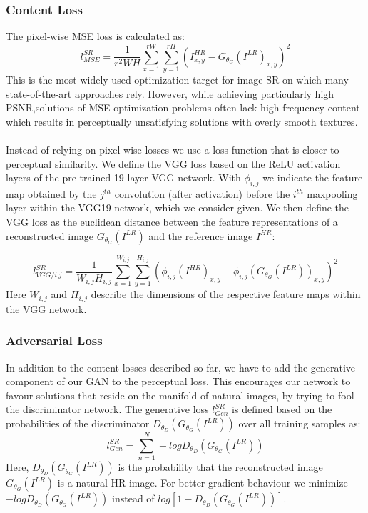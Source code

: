 \subsubsection{Content Loss}
The pixel-wise MSE loss is calculated as:
\begin{equation}
l_{MSE}^{SR}=\frac{1}{r^2WH}\sum_{x=1}^{rW}\sum_{y=1}^{rH}(I_{x,y}^{HR}-G_{\theta_{G}}(I^{LR})_{x,y})^2
\end{equation}
This is the most widely used optimization target for image
SR on which many state-of-the-art approaches rely. However, while achieving particularly high PSNR,solutions of MSE optimization problems often lack high-frequency content which results in perceptually unsatisfying solutions with overly smooth textures.\\ \\
Instead of relying on pixel-wise losses we use a loss function that is closer to perceptual similarity. We define the VGG loss based on the ReLU activation layers of the pre-trained 19 layer VGG network. With $\phi_{i,j}$ we indicate the feature map obtained by the $j^{th}$ convolution (after activation) before the $i^{th}$ maxpooling layer within the VGG19 network, which we consider given. We then define the VGG loss as the euclidean distance between the feature representations of a reconstructed image $G_{\theta_{G}}(I^{LR})$ and the reference image $I^{HR}$:

\begin{equation}
l_{VGG/i.j}^{SR}=\frac{1}{W_{i,j}H_{i,j}}\sum_{x=1}^{W_{i,j}}\sum_{y=1}^{H_{i,j}}(\phi_{i,j}(I^{HR})_{x,y}-\phi_{i,j}(G_{\theta_{G}}(I^{LR}))_{x,y})^2
\end{equation}
Here $W_{i,j}$ and $H_{i,j}$ describe the dimensions of the respective feature maps within the VGG network.

\subsubsection{Adversarial Loss}
In addition to the content losses described so far, we have to add the generative component of our GAN to the perceptual loss. This encourages our network to favour solutions that reside on the manifold of natural images, by trying to fool the discriminator network. The generative loss $l_{Gen}^{SR}$ is defined based on the probabilities of the discriminator $D_{\theta_{D}}(G_{\theta_{G}}(I^{LR}))$ over all training samples as:
\begin{equation}
l_{Gen}^{SR}=\sum_{n=1}^{N}-logD_{\theta_{D}}(G_{\theta_{G}}(I^{LR}))
\end{equation}
Here, $D_{\theta_{D}}(G_{\theta_{G}}(I^{LR}))$ is the probability that the reconstructed image $G_{\theta_{G}}(I^{LR})$ is a natural HR image. For better gradient behaviour we minimize $-logD_{\theta_{D}}(G_{\theta_{G}}(I^{LR}))$ instead of $log[1-D_{\theta_{D}}(G_{\theta_{G}}(I^{LR}))]$.
 
 